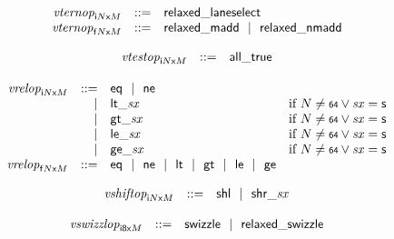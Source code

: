 $$
\begin{array}[t]{@{}lrrl@{}l@{}}
& {{\mathit{vternop}}}_{{{\mathsf{i}}{N}}{\mathsf{x}}{M}} & ::= & \mathsf{relaxed\_laneselect} \\
& {{\mathit{vternop}}}_{{{\mathsf{f}}{N}}{\mathsf{x}}{M}} & ::= & \mathsf{relaxed\_madd} ~~|~~ \mathsf{relaxed\_nmadd} \\
\end{array}
$$

$$
\begin{array}[t]{@{}lrrl@{}l@{}}
& {{\mathit{vtestop}}}_{{{\mathsf{i}}{N}}{\mathsf{x}}{M}} & ::= & \mathsf{all\_true} \\
\end{array}
$$

$$
\begin{array}[t]{@{}lrrl@{}l@{}}
& {{\mathit{vrelop}}}_{{{\mathsf{i}}{N}}{\mathsf{x}}{M}} & ::= & \mathsf{eq} ~~|~~ \mathsf{ne} \\
& & | & {\mathsf{lt}}{\mathsf{\_}}{{\mathit{sx}}} & \quad \mbox{if}~ N \neq \mathsf{{\scriptstyle 64}} \lor {\mathit{sx}} = \mathsf{s} \\
& & | & {\mathsf{gt}}{\mathsf{\_}}{{\mathit{sx}}} & \quad \mbox{if}~ N \neq \mathsf{{\scriptstyle 64}} \lor {\mathit{sx}} = \mathsf{s} \\
& & | & {\mathsf{le}}{\mathsf{\_}}{{\mathit{sx}}} & \quad \mbox{if}~ N \neq \mathsf{{\scriptstyle 64}} \lor {\mathit{sx}} = \mathsf{s} \\
& & | & {\mathsf{ge}}{\mathsf{\_}}{{\mathit{sx}}} & \quad \mbox{if}~ N \neq \mathsf{{\scriptstyle 64}} \lor {\mathit{sx}} = \mathsf{s} \\
& {{\mathit{vrelop}}}_{{{\mathsf{f}}{N}}{\mathsf{x}}{M}} & ::= & \mathsf{eq} ~~|~~ \mathsf{ne} ~~|~~ \mathsf{lt} ~~|~~ \mathsf{gt} ~~|~~ \mathsf{le} ~~|~~ \mathsf{ge} \\
\end{array}
$$

$$
\begin{array}[t]{@{}lrrl@{}l@{}}
& {{\mathit{vshiftop}}}_{{{\mathsf{i}}{N}}{\mathsf{x}}{M}} & ::= & \mathsf{shl} ~~|~~ {\mathsf{shr}}{\mathsf{\_}}{{\mathit{sx}}} \\
\end{array}
$$

$$
\begin{array}[t]{@{}lrrl@{}l@{}}
& {{\mathit{vswizzlop}}}_{{\mathsf{i{\scriptstyle 8}}}{\mathsf{x}}{M}} & ::= & \mathsf{swizzle} ~~|~~ \mathsf{relaxed\_swizzle} \\
\end{array}
$$

